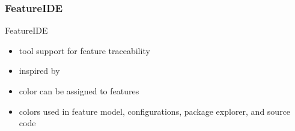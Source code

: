 \subsubsection*{FeatureIDE}
\begin{frame}{\myframetitle}
	\begin{mycolumns}[animation=none,widths={65}]
	\mynextcolumn
		\begin{definition}{FeatureIDE\mysource{\featureide}}
			\begin{itemize}
				\item tool support for feature traceability
				\item inspired by \featurecommander
				\item color can be assigned to features
				\item colors used in feature model, configurations, package explorer, and source code
			\end{itemize}
		\end{definition}
	\end{mycolumns}
\end{frame}

